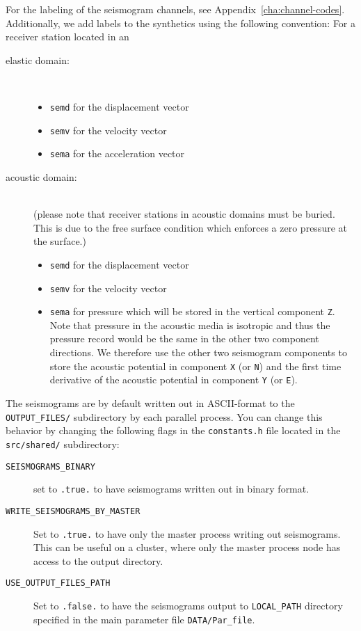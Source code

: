 For the labeling of the seismogram channels, see Appendix~\ref{cha:channel-codes}.
Additionally, we add labels to the synthetics using the following
convention: For a receiver station located in an
\begin{description}
\item [{elastic domain:}] ~\\


\begin{itemize}
\item \texttt{semd} for the displacement vector
\item \texttt{semv} for the velocity vector
\item \texttt{sema} for the acceleration vector
\end{itemize}
\item [{acoustic domain:}] ~\\
 (please note that receiver stations in acoustic domains must be buried.
This is due to the free surface condition which enforces a zero pressure
at the surface.)

\begin{itemize}
\item \texttt{semd} for the displacement vector
\item \texttt{semv} for the velocity vector
\item \texttt{sema} for pressure which will be stored in the vertical component
\texttt{Z}. Note that pressure in the acoustic media is isotropic
and thus the pressure record would be the same in the other two component
directions. We therefore use the other two seismogram components to
store the acoustic potential in component \texttt{X} (or \texttt{N})
and the first time derivative of the acoustic potential in component
\texttt{Y} (or \texttt{E}).
\end{itemize}
\end{description}
The seismograms are by default written out in ASCII-format to the
\texttt{OUTPUT\_FILES/} subdirectory by each parallel process. You
can change this behavior by changing the following flags in the \texttt{constants.h}
file located in the \texttt{src/shared/} subdirectory:
\begin{description}
\item [{\texttt{SEISMOGRAMS\_BINARY}}] set to \texttt{.true.} to have seismograms
written out in binary format.
\item [{\texttt{WRITE\_SEISMOGRAMS\_BY\_MASTER}}] Set to \texttt{.true.}
to have only the master process writing out seismograms. This can
be useful on a cluster, where only the master process node has access
to the output directory.
\item [{\texttt{USE\_OUTPUT\_FILES\_PATH}}] Set to \texttt{.false.} to
have the seismograms output to \texttt{LOCAL\_PATH} directory specified
in the main parameter file \texttt{DATA/Par\_file}.
\end{description}

